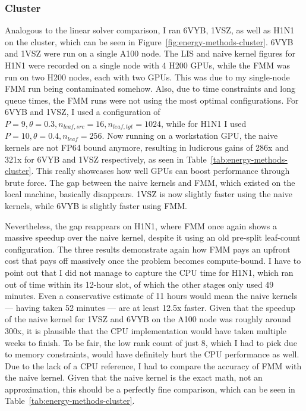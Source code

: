 %
%




\subsubsection{Cluster}

Analogous to the linear solver comparison, I ran 6VYB, 1VSZ, as well as H1N1 on the cluster, which can be seen in Figure~\ref{fig:energy-methods-cluster}.
6VYB and 1VSZ were run on a single A100 node.
The LIS and naive kernel figures for H1N1 were recorded on a single node with 4 H200 GPUs, while the FMM was run on two H200 nodes, each with two GPUs.
This was due to my single-node FMM run being contaminated somehow.
Also, due to time constraints and long queue times, the FMM runs were not using the most optimal configurations.
For 6VYB and 1VSZ, I used a configuration of $P = 9, \theta = 0.3, n_{leaf,src} = 16, n_{leaf,tgt} = 1024$, while for H1N1 I used $P = 10, \theta = 0.4, n_{leaf} = 256$.
Now running on a workstation GPU, the naive kernels are not FP64 bound anymore, resulting in ludicrous gains of 286x and 321x for 6VYB and 1VSZ respectively, as seen in Table~\ref{tab:energy-methods-cluster}.
This really showcases how well GPUs can boost performance through brute force.
The gap between the naive kernels and FMM, which existed on the local machine, basically disappears.
1VSZ is now slightly faster using the naive kernels, while 6VYB is slightly faster using FMM.

Nevertheless, the gap reappears on H1N1, where FMM once again shows a massive speedup over the naive kernel, despite it using an old pre-split leaf-count configuration.
The three results demonstrate again how FMM pays an upfront cost that pays off massively once the problem becomes compute-bound.
I have to point out that I did not manage to capture the CPU time for H1N1, which ran out of time within its 12-hour slot, of which the other stages only used 49 minutes.
Even a conservative estimate of 11 hours would mean the naive kernels --- having taken 52 minutes --- are at least 12.5x faster.
Given that the speedup of the naive kernel for 1VSZ and 6VYB on the A100 node was roughly around 300x, it is plausible that the CPU implementation would have taken multiple weeks to finish.
To be fair, the low rank count of just 8, which I had to pick due to memory constraints, would have definitely hurt the CPU performance as well.
Due to the lack of a CPU reference, I had to compare the accuracy of FMM with the naive kernel.
Given that the naive kernel is the exact math, not an approximation, this should be a perfectly fine comparison, which can be seen in Table~\ref{tab:energy-methods-cluster}.

